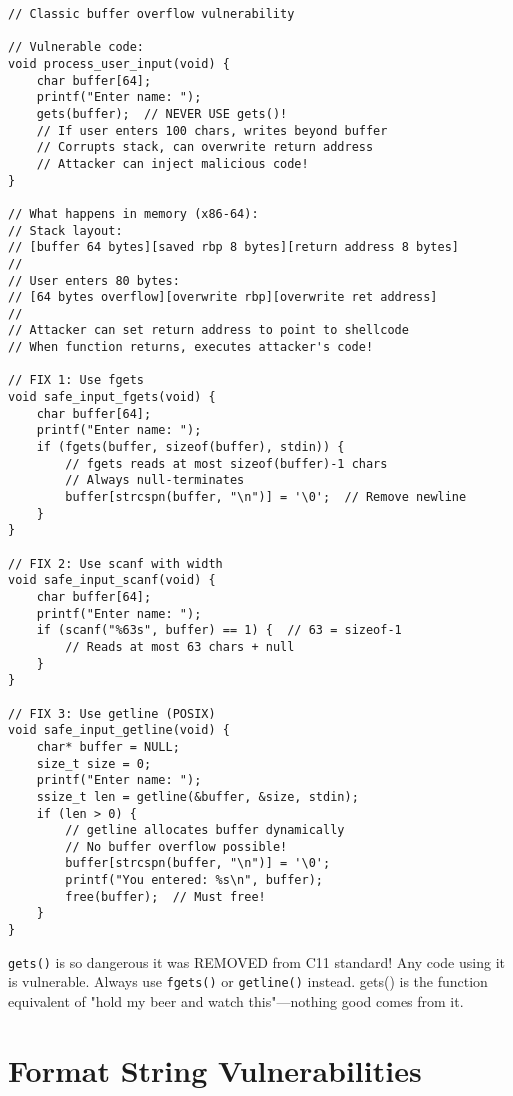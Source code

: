 \begin{lstlisting}
// Classic buffer overflow vulnerability

// Vulnerable code:
void process_user_input(void) {
    char buffer[64];
    printf("Enter name: ");
    gets(buffer);  // NEVER USE gets()!
    // If user enters 100 chars, writes beyond buffer
    // Corrupts stack, can overwrite return address
    // Attacker can inject malicious code!
}

// What happens in memory (x86-64):
// Stack layout:
// [buffer 64 bytes][saved rbp 8 bytes][return address 8 bytes]
//
// User enters 80 bytes:
// [64 bytes overflow][overwrite rbp][overwrite ret address]
//
// Attacker can set return address to point to shellcode
// When function returns, executes attacker's code!

// FIX 1: Use fgets
void safe_input_fgets(void) {
    char buffer[64];
    printf("Enter name: ");
    if (fgets(buffer, sizeof(buffer), stdin)) {
        // fgets reads at most sizeof(buffer)-1 chars
        // Always null-terminates
        buffer[strcspn(buffer, "\n")] = '\0';  // Remove newline
    }
}

// FIX 2: Use scanf with width
void safe_input_scanf(void) {
    char buffer[64];
    printf("Enter name: ");
    if (scanf("%63s", buffer) == 1) {  // 63 = sizeof-1
        // Reads at most 63 chars + null
    }
}

// FIX 3: Use getline (POSIX)
void safe_input_getline(void) {
    char* buffer = NULL;
    size_t size = 0;
    printf("Enter name: ");
    ssize_t len = getline(&buffer, &size, stdin);
    if (len > 0) {
        // getline allocates buffer dynamically
        // No buffer overflow possible!
        buffer[strcspn(buffer, "\n")] = '\0';
        printf("You entered: %s\n", buffer);
        free(buffer);  // Must free!
    }
}
\end{lstlisting}

\begin{warningbox}
\texttt{gets()} is so dangerous it was REMOVED from C11 standard! Any code using it is vulnerable. Always use \texttt{fgets()} or \texttt{getline()} instead. gets() is the function equivalent of "hold my beer and watch this"—nothing good comes from it.
\end{warningbox}

\section{Format String Vulnerabilities}

